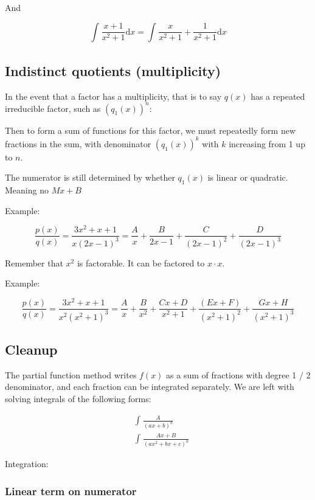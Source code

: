 \documentclass[12pt]{article}
\theoremstyle{plain}
\theoremstyle{remark}
\theoremstyle{definition}
\begin{document}
And

\[\int_{}^{}{\frac{x + 1}{x^{2} + 1}\text{d}x} = \int_{}^{}{\frac{x}{x^{2} + 1} + \frac{1}{x^{2} + 1}\text{d}x}\]


\subsection{Indistinct quotients
(multiplicity)}

In the event that a factor has a multiplicity, that is to say \(q(x)\)
has a repeated irreducible factor, such as
\(\left( q_{1}(x) \right)^{n}\):

Then to form a sum of functions for this factor, we must repeatedly form
new fractions in the sum, with denominator
\(\left( q_{1}(x) \right)^{k}\) with \(k\) increasing from 1 up to
\(n\).

The numerator is still determined by whether \(q_{1}(x)\) is linear or
quadratic. Meaning no \(Mx + B\)

Example:

\[\frac{p(x)}{q(x)} = \frac{3x^{2} + x + 1}{x(2x - 1)^{3}} = \frac{A}{x} + \frac{B}{2x - 1} + \frac{C}{(2x - 1)^{2}} + \frac{D}{(2x - 1)^{3}}\]

Remember that \(x^{2}\) is factorable. It can be factored to
\(x \cdot x\).

Example:

\[\frac{p(x)}{q(x)} = \frac{3x^{2} + x + 1}{x^{2}\left( x^{2} + 1 \right)^{3}} = \frac{A}{x} + \frac{B}{x^{2}} + \frac{Cx + D}{x^{2} + 1} + \frac{(Ex + F)}{\left( x^{2} + 1 \right)^{2}} + \frac{Gx + H}{\left( x^{2} + 1 \right)^{3}}\]


\subsection{Cleanup}

The partial function method writes \(f(x)\) as a sum of fractions with
degree 1 / 2 denominator, and each fraction can be integrated
separately. We are left with solving integrals of the following forms:

\begin{align*}
&\int_{}^{}\frac{A}{(ax + b)^{k}} \\
&\int_{}^{}\frac{Ax + B}{\left( ax^{2} + bx + c \right)^{k}}
\end{align*}


Integration:


\subsubsection{Linear term on
numerator}
\end{document}
